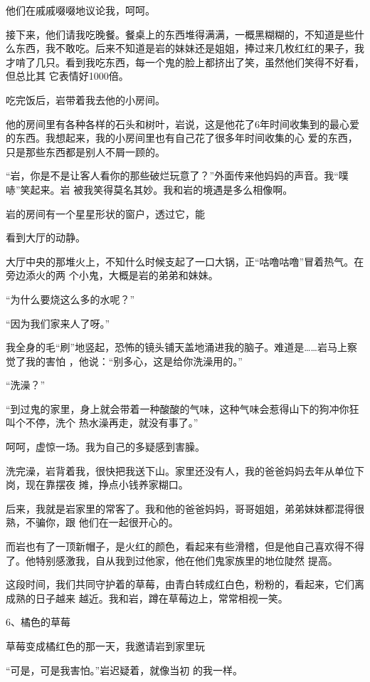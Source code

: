 \documentclass{article}
\begin{document}
\newpage

他们在戚戚啜啜地议论我，呵呵。 

接下来，他们请我吃晚餐。餐桌上的东西堆得满满，一概黑糊糊的，不知道是些什么东西，我不敢吃。后来不知道是岩的妹妹还是姐姐，捧过来几枚红红的果子，我才啃了几只。看到我吃东西，每一个鬼的脸上都挤出了笑，虽然他们笑得不好看，但总比其
它表情好1000倍。 


吃完饭后，岩带着我去他的小房间。 

他的房间里有各种各样的石头和树叶，岩说，这是他花了6年时间收集到的最心爱的东西。我想起来，我的小房间里也有自己花了很多年时间收集的心
爱的东西，只是那些东西都是别人不屑一顾的。 

“岩，你是不是让客人看你的那些破烂玩意了？”外面传来他妈妈的声音。我“噗哧”笑起来。岩
被我笑得莫名其妙。我和岩的境遇是多么相像啊。 

岩的房间有一个星星形状的窗户，透过它，能

\newpage
看到大厅的动静。 

大厅中央的那堆火上，不知什么时候支起了一口大锅，正“咕噜咕噜”冒着热气。在旁边添火的两
个小鬼，大概是岩的弟弟和妹妹。 


“为什么要烧这么多的水呢？” 


“因为我们家来人了呀。” 


我全身的毛“刷”地竖起，恐怖的镜头铺天盖地涌进我的脑子。难道是……岩马上察觉了我的害怕
，他说：“别多心，这是给你洗澡用的。” 


“洗澡？” 

“到过鬼的家里，身上就会带着一种酸酸的气味，这种气味会惹得山下的狗冲你狂叫个不停，洗个
热水澡再走，就没有事了。” 

呵呵，虚惊一场。我为自己的多疑感到害臊。
\newpage


洗完澡，岩背着我，很快把我送下山。家里还没有人，我的爸爸妈妈去年从单位下岗，现在靠摆夜
摊，挣点小钱养家糊口。 

后来，我就是岩家里的常客了。我和他的爸爸妈妈，哥哥姐姐，弟弟妹妹都混得很熟，不骗你，跟
他们在一起很开心的。 

而岩也有了一顶新帽子，是火红的颜色，看起来有些滑稽，但是他自己喜欢得不得了。他特别感激我，自从我到过他家，他在他们鬼家族里的地位陡然
提高。 

这段时间，我们共同守护着的草莓，由青白转成红白色，粉粉的，看起来，它们离成熟的日子越来
越近。我和岩，蹲在草莓边上，常常相视一笑。 


6、橘色的草莓 

草莓变成橘红色的那一天，我邀请岩到家里玩
\newpage


“可是，可是我害怕。”岩迟疑着，就像当初
的我一样。 
\end{document}
